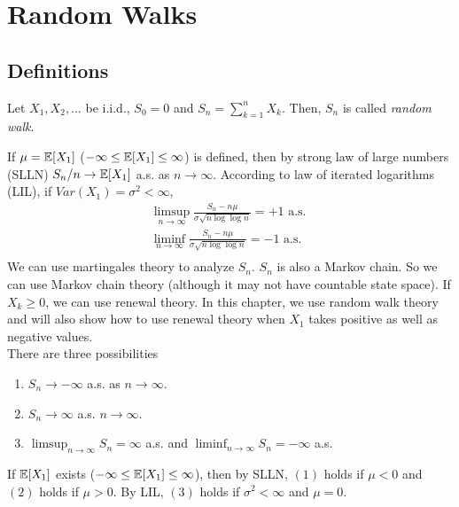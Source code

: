 \documentclass[all-lectures.tex]{subfiles}
\begin{document}

\setcounter{section}{1}
\setcounter{subsection}{1}
\chapter{Random Walks}
\section*{}
\section{Definitions}
\begin{defn}
Let $X_1,X_2,\dots$ be i.i.d., $S_0 = 0$ and $S_n = \sum_{k=1}^n X_k$. Then, $S_n$ is called \textit{random walk}. 
\end{defn}

If $\mu = \mathbb{E}[X_1]$ ($-\infty \leq \mathbb{E}[X_1] \leq \infty$) is defined, then by strong law of large numbers (SLLN) $S_n/n \to \mathbb{E}[X_1]$ a.s. as $n \to \infty$. According to law of iterated logarithms (LIL), if $Var(X_1) = \sigma^2 < \infty$,
\begin{align*}
\limsup_{n \to \infty} \frac{S_n-n\mu}{\sigma \sqrt{n\log \log n}} = +1 \text{ a.s. } \\
\liminf_{n \to \infty} \frac{S_n-n\mu}{\sigma \sqrt{n\log \log n}} = -1 \text{ a.s. } \\
\end{align*}
We can use martingales theory to analyze $S_n$. $S_n$ is also a Markov chain. So we can use Markov chain theory (although it may not have countable state space). If $X_k \geq 0$, we can use renewal theory. In this chapter, we use random walk theory and will also show how to use renewal theory when $X_1$ takes positive as well as negative values.\\
\indent There are three possibilities
\begin{enumerate}[label=(\arabic*)]
\item  $S_n \to -\infty$ a.s. as $n \to \infty$.
\item  $S_n \to \infty$ a.s. $n \to \infty$. 
\item  $\limsup_{n\to \infty} S_n = \infty$ a.s. and $\liminf_{n\to \infty} S_n = -\infty$ a.s.
\end{enumerate}
If $\mathbb{E}[X_1]$ exists ($-\infty \leq \mathbb{E}[X_1] \leq \infty$), then by SLLN, $(1)$ holds if $\mu <0$ and $(2)$ holds if $\mu>0$. By LIL, $(3)$ holds if $\sigma^2 < \infty$ and $\mu = 0$.
\end{document}
